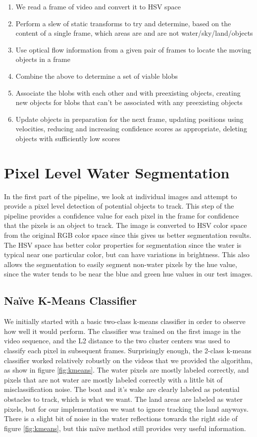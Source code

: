 \documentclass{article}
\begin{document}
\begin{enumerate}
\item We read a frame of video and convert it to HSV space
\item Perform a slew of static transforms to try and determine,
      based on the content of a single frame, which areas are and
      are not water/sky/land/objects
\item Use optical flow information from a given pair of frames to
      locate the moving objects in a frame
\item Combine the above to determine a set of viable blobs
\item Associate the blobs with each other and with preexisting objects,
      creating new objects for blobs that can't be associated with any
      preexisting objects
\item Update objects in preparation for the next frame, updating
      positions using velocities, reducing and increasing confidence
      scores as appropriate, deleting objects with sufficiently low
      scores
\end{enumerate}

\section{Pixel Level Water Segmentation}
In the first part of the pipeline, we look at individual images and attempt to
provide a pixel level detection of potential objects to track.  This step of the
pipeline provides a confidence value for each pixel in the frame for confidence
that the pixels is an object to track.
The image is converted to HSV color space from the original RGB color space since
this gives us better segmentation results. The HSV space has better color
properties for segmentation since the water is typical near one particular
color, but can have variations in brightness.  This also allows the segmentation
to easily segment non-water pixels by the hue value, since the water tends to be
near the blue and green hue values in our test images.

\subsection{Na\"ive K-Means Classifier}
We initially started with a basic two-class k-means classifier in order to
observe how well it would perform.  The classifier was trained on the first
image in the video sequence, and the L2 distance to the two cluster centers was
used to classify each pixel in subsequent frames.  Surprisingly enough, the
2-class k-means classifier worked relatively robustly on the videos that we
provided the algorithm, as show in figure \ref{fig:kmeans}.  The water pixels
are mostly labeled correctly, and pixels that are not water are mostly labeled correctly with a little bit of misclassification noise.  The boat and it's
wake are clearly labeled as potential obstacles to track, which is what we want.
The land areas are labeled as water pixels, but for our implementation we want
to ignore tracking the land anyways. There is a slight bit of noise in the water
reflections towards the right side of figure \ref{fig:kmeans}, but this na\"ive
method still provides very useful information.
\end{document}
